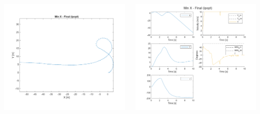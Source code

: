 \documentclass[aspectratio=169]{beamer}
\begin{document}
\begin{frame}
\begin{columns}
\begin{column}{0.25\textwidth}
			\includegraphics[width = \columnwidth]{figs/Min_X_-_Final_(ipopt)_quiver.png}
		\end{column}
		\begin{column}{0.4\textwidth}
			\includegraphics[width = \columnwidth]{figs/Min_X_-_Final_(ipopt)_traj.png}			
		\end{column}
	\end{columns}
\end{frame}
\end{document}

